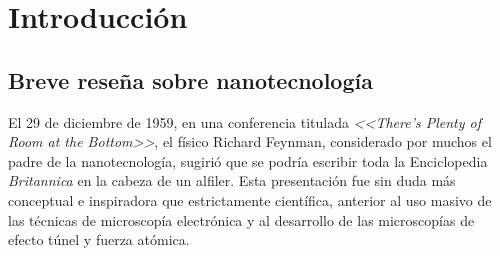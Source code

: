  \newcommand{\NoBiblioIntro}[1]{
 \ifthenelse{\equal{#1}{verdadero}}{}{}
 \NoBiblioIntro{verdadero}}


 \FormatoCapituloUnaLinea

 \chapter{Introducción}\label{chap:Introduccion}

 \thispagestyle{empty}
	

 
 \vfill
 \minitoc
 \newpage

\section{Breve reseña sobre nanotecnología}


	 El 29 de diciembre de 1959, en una conferencia titulada \textit{<<There's Plenty of Room at the Bottom>>}, el físico Richard Feynman, considerado por muchos el padre de la nanotecnología, sugirió que se podría escribir toda la Enciclopedia \textit{Britannica} en la cabeza de un alfiler.\cite{Feynman1959} Esta presentación fue sin duda más conceptual e inspiradora que estrictamente científica, anterior al uso masivo de las técnicas de microscopía electrónica y al desarrollo de las microscopías de efecto túnel y fuerza atómica.  

